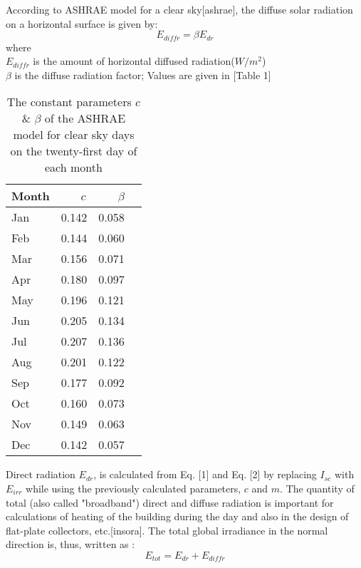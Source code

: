 \documentclass[times, 10pt,a4paper]{article}
\begin{document}
According to ASHRAE model for a clear sky[ashrae], the diffuse solar radiation on a horizontal surface is given by:
\begin{equation}
E_{diffr} = \beta E_{dr}
\end{equation}
where \\ 
$E_{diffr}$ is the amount of horizontal diffused radiation($W/m^2$) \\
$\beta$ is the diffuse radiation factor; Values are given in [Table 1] \\
%
\begin{table}[t]
\begin{center}
\caption{The constant parameters $c$ \& $\beta$ of the ASHRAE model for clear sky
days on the twenty-first day of each month}
\begin{tabular}{ | l | l | l | p{5cm} |}
\hline
Month & \ \ \ $c$ & \ \ \ $\beta$ \\ \hline
Jan & 0.142 & 0.058 \\ \hline
Feb & 0.144 & 0.060 \\ \hline
Mar & 0.156 & 0.071 \\ \hline
Apr & 0.180 & 0.097 \\ \hline
May & 0.196 & 0.121 \\ \hline
Jun & 0.205 & 0.134 \\ \hline
Jul & 0.207 & 0.136 \\ \hline
Aug & 0.201 & 0.122 \\ \hline
Sep & 0.177 & 0.092 \\ \hline
Oct & 0.160 & 0.073 \\ \hline
Nov & 0.149 & 0.063 \\ \hline
Dec & 0.142 & 0.057 \\
\hline
\end{tabular}
\end{center}
\end{table}
%
%
Direct radiation $E_{dr}$, is calculated from Eq. [1] and Eq. [2] by replacing $I_{sc}$ with $E_{irr}$ while using the 
previously calculated parameters, $c$ and $m$.
The quantity of total (also called "broadband") direct and diffuse radiation is important for calculations of
heating of the building during the day and also in the design of flat-plate collectors, etc.[insora]. The total global irradiance 
in the normal direction is, thus, written as :
\begin{equation}
E_{tot} = E_{dr} + E_{diffr} 
\end{equation}
%
\end{document}
